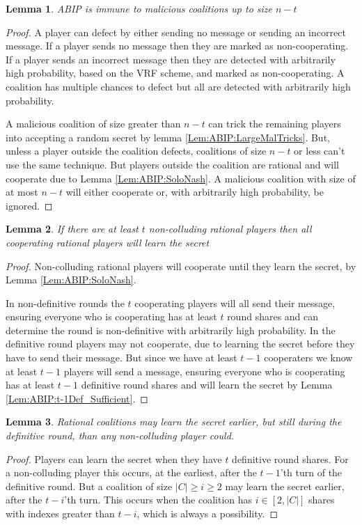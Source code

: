 \documentclass{dalcsthesis}
\newtheorem{lemma}{Lemma}
\begin{document}
\begin{lemma} ABIP is immune to malicious coalitions up to size $n-t$ \label{Lem:ABIP:SmallMalImmune} \end{lemma}
\begin{proof}
A player can defect by either sending no message or sending an incorrect message. If a player sends no message then they are marked as non-cooperating. If a player sends an incorrect message then they are detected with arbitrarily high probability, based on the VRF scheme, and marked as non-cooperating. A coalition has multiple chances to defect but all are detected with arbitrarily high probability.

A malicious coalition of size greater than $n-t$ can trick the remaining players into accepting a random secret by lemma \ref{Lem:ABIP:LargeMalTricks}. But, unless a player outside the coalition defects, coalitions of size $n-t$ or less can't use the same technique. But players outside the coalition are rational and will cooperate due to Lemma \ref{Lem:ABIP:SoloNash}. A malicious coalition with size of at most $n-t$ will either cooperate or, with arbitrarily high probability, be ignored.
\end{proof}

\begin{lemma} If there are at least $t$ non-colluding rational players then all cooperating rational players will learn the secret \label{Lem:ABIP:WorksForEnoughSoloRats} \end{lemma}
\begin{proof}
Non-colluding rational players will cooperate until they learn the secret, by Lemma \ref{Lem:ABIP:SoloNash}.

In non-definitive rounds the $t$ cooperating players will all send their message, ensuring everyone who is cooperating has at least $t$ round shares and can determine the round is non-definitive with arbitrarily high probability. In the definitive round players may not cooperate, due to learning the secret before they have to send their message. But since we have at least $t-1$ cooperaters we know at least $t-1$ players will send a message, ensuring everyone who is cooperating has at least $t-1$ definitive round shares and will learn the secret by Lemma \ref{Lem:ABIP:t-1Def_Sufficient}. 
\end{proof}

\begin{lemma} Rational coalitions may learn the secret earlier, but still during the definitive round, than any non-colluding player could. \label{Lem:ABIP:Preempt} \end{lemma}
\begin{proof}
Players can learn the secret when they have $t$ definitive round shares. For a non-colluding player this occurs, at the earliest, after the $t-1$'th turn of the definitive round. But a coalition of size $|C| \geq i \geq 2$ may learn the secret earlier, after the $t-i$'th turn. This occurs when the coalition has $i \in [2, |C|]$ shares with indexes greater than $t-i$, which is always a possibility.
\end{proof}
\end{document}
